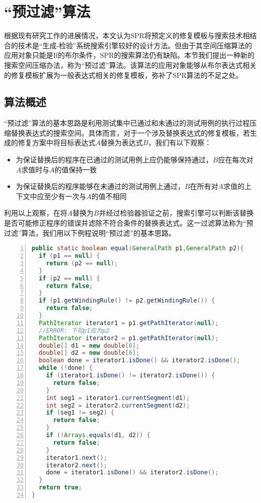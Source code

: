 
\section{“预过滤”算法}%

根据现有研究工作的进展情况，本文认为SPR将预定义的修复模板与搜索技术相结合的技术是“生成-检验”系统搜索引擎较好的设计方法。但由于其空间压缩算法的应用对象只能是If的布尔条件，SPR的搜索算法仍有缺陷。本节我们提出一种新的搜索空间压缩办法，称为“预过滤”算法。该算法的应用对象能够从布尔表达式相关的修复模板扩展为一般表达式相关的修复模板，弥补了SPR算法的不足之处。

\subsection{算法概述}
“预过滤”算法的基本思路是利用测试集中已通过和未通过的测试用例的执行过程压缩替换表达式的搜索空间。具体而言，对于一个涉及替换表达式的修复模板，若生成的修复方案中将目标表达式$A$替换为表达式$B$，我们有以下观察：
\begin{itemize}
	\item 为保证替换后的程序在已通过的测试用例上应仍能够保持通过，$B$应在每次对$A$求值时与$A$的值保持一致
	\item 为保证替换后的程序能够在未通过的测试用例上通过，$B$在所有对$A$求值的上下文中应至少有一次与$A$的值不相同
\end{itemize}

利用以上观察，在将$A$替换为$B$并经过检验器验证之前，搜索引擎可以判断该替换是否可能修正程序的错误并滤除不符合条件的替换表达式。这一过滤算法称为“预过滤”算法，我们用以下例程说明“预过滤”的基本思路。
\begin{lstlisting}[caption=错误示例 jfreechart-11/ShapeUtilities.java,frame=single,language=Java,numbers=left,basicstyle=\ttfamily\footnotesize,label={code:jfreechart11}]
public static boolean equal(GeneralPath p1,GeneralPath p2){
  if (p1 == null) {
    return (p2 == null);
  }
  if (p2 == null) {
    return false;
  }
  if (p1.getWindingRule() != p2.getWindingRule()) {
    return false;
  }
  PathIterator iterator1 = p1.getPathIterator(null);
  //ERROR: 下句p1应为p2
  PathIterator iterator2 = p1.getPathIterator(null);
  double[] d1 = new double[6];
  double[] d2 = new double[6];
  boolean done = iterator1.isDone() && iterator2.isDone();
  while (!done) {
    if (iterator1.isDone() != iterator2.isDone()) {
      return false;
    }
    int seg1 = iterator1.currentSegment(d1);
    int seg2 = iterator2.currentSegment(d2);
    if (seg1 != seg2) {
      return false;
    }
    if (!Arrays.equals(d1, d2)) {
      return false;
    }
    iterator1.next();
    iterator2.next();
    done = iterator1.isDone() && iterator2.isDone();
  }
  return true;
}
\end{lstlisting}

